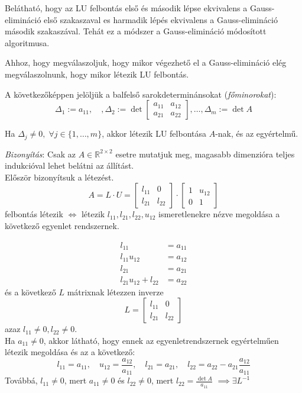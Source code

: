 Belátható, hogy az LU felbontás első és második lépse ekvivalens a Gauss-elimináció első szakaszaval es harmadik lépés ekvivalens a Gauss-elimináció második szakaszával. Tehát ez a módszer a Gauss-elimináció módosított algoritmusa.

Ahhoz, hogy megválaszoljuk, hogy mikor végezhető el a Gauss-elimináció elég megválaszolnunk, hogy mikor létezik LU felbontás.

A következőképpen jelöljük a balfelső sarokdeterminánsokat (\textit{főminorokat}):
\begin{equation*}
    \Delta_{1} := a_{11}, \quad, \Delta_{2} := \det \begin{bmatrix}
    a_{11} & a_{12} \\
    a_{21} & a_{22}
    \end{bmatrix}
    ,
    \dots,
    \Delta_{m} := \det A
\end{equation*}

\begin{allitas}
    Ha $\Delta_{j} \neq 0, \; \forall j \in \{1, \dots, m\}$, akkor létezik LU felbontása $A$-nak, és az egyértelmű.
\end{allitas}
\textit{Bizonyítás}: Csak az $A \in \mathbb{R}^{2 \times 2}$ esetre mutatjuk meg, magasabb dimenzióra teljes indukcióval lehet belátni az állítást. \\
Először bizonyítsuk a létezést.
$$
A = L \cdot U = 
\begin{bmatrix}
l_{11} & 0 \\
l_{21} & l_{22}
\end{bmatrix}
\cdot
\begin{bmatrix}
1 & u_{12} \\
0 & 1
\end{bmatrix}
$$
felbontás létezik $\iff$ létezik $l_{11}, l_{21}, l_{22}, u_{12}$ ismeretlenekre nézve megoldása a következő egyenlet rendszernek.

\begin{align*}
l_{11} & = a_{11} \\
l_{11} u_{12} & = a_{12} \\
l_{21} & = a_{21} \\
l_{21} u_{12} + l_{22} & = a_{22}
\end{align*}
és a következő $L$ mátrixnak létezzen inverze
$$
L = \begin{bmatrix}
l_{11} & 0 \\
l_{21} & l_{22}
\end{bmatrix}
$$
azaz $l_{11} \neq 0, l_{22} \neq 0$. \\
Ha $a_{11} \neq 0$, akkor látható, hogy ennek az egyenletrendszernek egyértelműen létezik megoldása és az a következő:
\begin{equation*}
    l_{11} = a_{11}, \quad u_{12} = \frac{a_{12}}{a_{11}}, \quad l_{21} = a_{21}, \quad l_{22} = a_{22} - a_{21} \frac{a_{12}}{a_{11}}
\end{equation*}
Továbbá, $l_{11} \neq 0$, mert $a_{11} \neq 0$ és $l_{22} \neq 0$, mert $l_{22} = \frac{\det A}{a_{11}}$ $\implies \exists L^{-1}$

